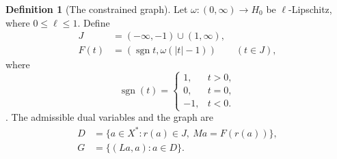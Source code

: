 \documentclass[11pt]{article}
\newcommand{\sgn}{\operatorname{sgn}}
\theoremstyle{definition}
\newtheorem{definition}{Definition}
\theoremstyle{remark}
\begin{document}
\begin{definition}[The constrained graph]
\label{def:construction-graph}
Let $\omega:(0,\infty)\to H_0$ be $\ell$-Lipschitz, where $0\le\ell\le1$. Define
\[
\begin{aligned}
J&=(-\infty,-1)\cup(1,\infty),\\
F(t)&=(\sgn t,\omega(|t|-1))\qquad(t\in J), 
\end{aligned}
\]
where \[
\operatorname{sgn}(t)=
\begin{cases}
1, & t>0,\\
0, & t=0,\\
-1, & t<0.
\end{cases}
\]. 
The admissible dual variables and the graph are
\begin{equation}
\begin{aligned}
D&=\{a\in X^*:r(a)\in J,\ Ma=F(r(a))\},\\
G&=\{(La,a):a\in D\}.
\end{aligned}
\label{eq:abs-full-graph}
\end{equation}
\end{definition}
\end{document}
